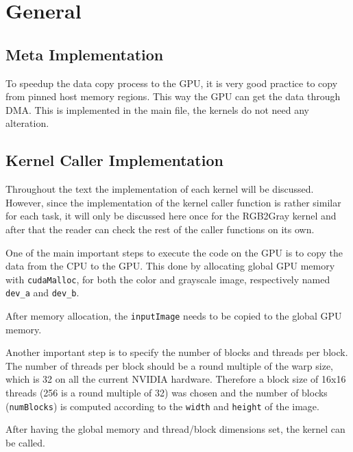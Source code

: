 \documentclass[final]{report}
\begin{document}
\chapter{General}

\section{Meta Implementation}
To speedup the data copy process to the GPU, it is very good practice to copy from pinned host memory regions.
This way the GPU can get the data through DMA.
This is implemented in the main file, the kernels do not need any alteration.

\section{Kernel Caller Implementation}
Throughout the text the implementation of each kernel will be discussed.
However, since the implementation of the kernel caller function is rather similar for each task, it will only be discussed here once for the RGB2Gray kernel and after that the reader can check the rest of the caller functions on its own.

One of the main important steps to execute the code on the GPU is to copy the data from the CPU to the GPU.
This done by allocating global GPU memory with \texttt{cudaMalloc}, for both the color and grayscale image, respectively named \texttt{dev\_a} and \texttt{dev\_b}.

After memory allocation, the \texttt{inputImage} needs to be copied to the global GPU memory.


Another important step is to specify the number of blocks and threads per block.
The number of threads per block should be a round multiple of the warp size, which is 32 on all the current NVIDIA hardware.
Therefore a block size of 16x16 threads (256 is a round multiple of 32) was chosen and the number of blocks (\texttt{numBlocks}) is computed according to the \texttt{width} and \texttt{height} of the image.


After having the global memory and thread/block dimensions set, the kernel can be called.

\end{document}
